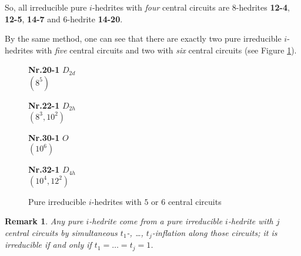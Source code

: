 \documentclass[12pt]{article}
\newtheorem{remark}{Remark}
\begin{document}
\begin{center}
\epsfxsize=150mm
\end{center}

So, all irreducible pure $i$-hedrites with {\em four} central circuits are $8$-hedrites {\bf 12-4}, {\bf 12-5}, {\bf 14-7} and $6$-hedrite {\bf 14-20}.

By the same method, one can see that there are exactly two pure irreducible $i$-hedrites with {\em five} central circuits and two with {\em six} central circuits (see Figure \ref{ThePureIrreducibleOctahedriteWith56CC}).

\begin{figure}
{\small
\setlength{\unitlength}{1cm}
\begin{minipage}[t]{3.5cm}
\centering
\epsfxsize=2.5cm
\par
{{\bf Nr.20-1} \quad $D_{2d}$ \\ $(8^5)$ \\ }
\end{minipage}
\begin{minipage}[t]{3.5cm}
\centering
\epsfxsize=2.5cm
\par
{{\bf Nr.22-1} \quad $D_{2h}$ \\ $(8^3,10^2)$ \\ }
\end{minipage}
\setlength{\unitlength}{1cm}
\begin{minipage}[t]{3.5cm}
\centering
\epsfxsize=2.3cm
\par
{{\bf Nr.30-1} \quad $O$ \\ $(10^6)$ \\}
\end{minipage}
\setlength{\unitlength}{1cm}
\begin{minipage}[t]{3.5cm}
\centering
\epsfxsize=2.3cm
\par
{{\bf Nr.32-1} \quad $D_{4h}$ \\ $(10^4,12^2)$ \\}
\end{minipage}
}
\caption{Pure irreducible $i$-hedrites with $5$ or $6$ central circuits}
\label{ThePureIrreducibleOctahedriteWith56CC}
\end{figure}


\begin{remark}

Any pure $i$-hedrite come from a pure irreducible $i$-hedrite with $j$ central circuits by simultaneous $t_1$-, \dots, $t_j$-inflation along those circuits; it is irreducible if and only if $t_1=\dots=t_j=1$.

\end{remark}
\end{document}
